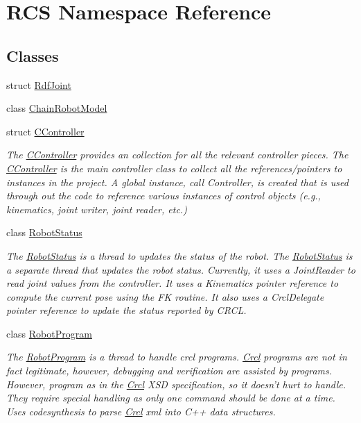 \hypertarget{namespaceRCS}{\section{R\-C\-S Namespace Reference}
\label{namespaceRCS}
}
\subsection*{Classes}
\begin{DoxyCompactItemize}
\item 
struct \hyperlink{structRCS_1_1RdfJoint}{Rdf\-Joint}
\item 
class \hyperlink{classRCS_1_1ChainRobotModel}{Chain\-Robot\-Model}
\item 
struct \hyperlink{structRCS_1_1CController}{C\-Controller}
\begin{DoxyCompactList}\small\item\em The \hyperlink{structRCS_1_1CController}{C\-Controller} provides an collection for all the relevant controller pieces. The \hyperlink{structRCS_1_1CController}{C\-Controller} is the main controller class to collect all the references/pointers to instances in the project. A global instance, call Controller, is created that is used through out the code to reference various instances of control objects (e.\-g., kinematics, joint writer, joint reader, etc.) \end{DoxyCompactList}\item 
class \hyperlink{classRCS_1_1RobotStatus}{Robot\-Status}
\begin{DoxyCompactList}\small\item\em The \hyperlink{classRCS_1_1RobotStatus}{Robot\-Status} is a thread to updates the status of the robot. The \hyperlink{classRCS_1_1RobotStatus}{Robot\-Status} is a separate thread that updates the robot status. Currently, it uses a Joint\-Reader to read joint values from the controller. It uses a Kinematics pointer reference to compute the current pose using the F\-K routine. It also uses a Crcl\-Delegate pointer reference to update the status reported by C\-R\-C\-L. \end{DoxyCompactList}\item 
class \hyperlink{classRCS_1_1RobotProgram}{Robot\-Program}
\begin{DoxyCompactList}\small\item\em The \hyperlink{classRCS_1_1RobotProgram}{Robot\-Program} is a thread to handle crcl programs. \hyperlink{namespaceCrcl}{Crcl} programs are not in fact legitimate, however, debugging and verification are assisted by programs. However, program as in the \hyperlink{namespaceCrcl}{Crcl} X\-S\-D specification, so it doesn't hurt to handle. They require special handling as only one command should be done at a time. Uses codesynthesis to parse \hyperlink{namespaceCrcl}{Crcl} xml into C++ data structures. \end{DoxyCompactList}\item 

\end{DoxyCompactItemize}
